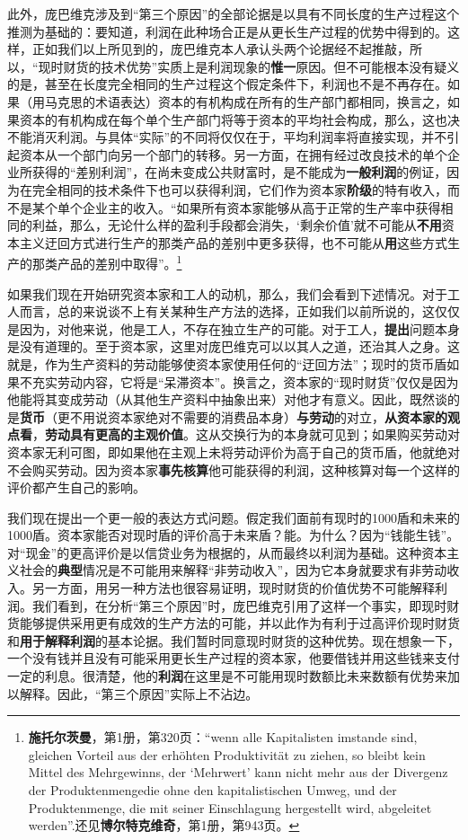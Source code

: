 \documentclass[fontset=fandol, a4paper, 12pt, openright]{ctexbook}
\begin{document}
此外，庞巴维克涉及到“第三个原因”的全部论据是以具有不同长度的生产过程这个推测为基础的：要知道，利润在此种场合正是从更长生产过程的优势中得到的。这样，正如我们以上所见到的，庞巴维克本人承认头两个论据经不起推敲，所以，“现时财货的技术优势”实质上是利润现象的\textbf{惟一}原因。但不可能根本没有疑义的是，甚至在长度完全相同的生产过程这个假定条件下，利润也不是不再存在。如果（用马克思的术语表达）资本的有机构成在所有的生产部门都相同，换言之，如果资本的有机构成在每个单个生产部门将等于资本的平均社会构成，那么，这也决不能消灭利润。与具体“实际”的不同将仅仅在于，平均利润率将直接实现，并不引起资本从一个部门向另一个部门的转移。另一方面，在拥有经过改良技术的单个企业所获得的“差别利润”，在尚未变成公共财富时，是不能成为\textbf{一般利润}的例证，因为在完全相同的技术条件下也可以获得利润，它们作为资本家\textbf{阶级}的特有收入，而不是某个单个企业主的收入。“如果所有资本家能够从高于正常的生产率中获得相同的利益，那么，无论什么样的盈利手段都会消失，‘剩余价值’就不可能从\textbf{不用}资本主义迂回方式进行生产的那类产品的差别中更多获得，也不可能从\textbf{用}这些方式生产的那类产品的差别中取得”。\footnote{\textbf{施托尔茨曼}，第1册，第320页：“wenn alle Kapitalisten imstande sind, gleichen Vorteil aus der erh\"{o}hten Produktivit\"{a}t zu ziehen, so bleibt kein Mittel des Mehrgewinns, der ‘Mehrwert’ kann nicht mehr aus der Divergenz der Produktenmengedie ohne den kapitalistischen Umweg, und der Produktenmenge, die mit seiner Einschlagung hergestellt wird, abgeleitet werden”.还见\textbf{博尔特克维奇}，第1册，第943页。}

如果我们现在开始研究资本家和工人的动机，那么，我们会看到下述情况。对于工人而言，总的来说谈不上有关某种生产方法的选择，正如我们以前所说的，这仅仅是因为，对他来说，他是工人，不存在独立生产的可能。对于工人，\textbf{提出}问题本身是没有道理的。至于资本家，这里对庞巴维克可以以其人之道，还治其人之身。这就是，作为生产资料的劳动能够使资本家使用任何的“迂回方法”；现时的货币盾如果不充实劳动内容，它将是“呆滞资本”。换言之，资本家的“现时财货”仅仅是因为他能将其变成劳动（从其他生产资料中抽象出来）对他才有意义。因此，既然谈的是\textbf{货币}（更不用说资本家绝对不需要的消费品本身）\textbf{与劳动}的对立，\textbf{从资本家的观点看}，\textbf{劳动具有更高的主观价值}。这从交换行为的本身就可见到；如果购买劳动对资本家无利可图，即如果他在主观上未将劳动评价为高于自己的货币盾，他就绝对不会购买劳动。因为资本家\textbf{事先核算}他可能获得的利润，这种核算对每一个这样的评价都产生自己的影响。

我们现在提出一个更一般的表达方式问题。假定我们面前有现时的1000盾和未来的1000盾。资本家能否对现时盾的评价高于未来盾？能。为什么？因为“钱能生钱”。对“现金”的更高评价是以信贷业务为根据的，从而最终以利润为基础。这种资本主义社会的\textbf{典型}情况是不可能用来解释“非劳动收入”，因为它本身就要求有非劳动收入。另一方面，用另一种方法也很容易证明，现时财货的价值优势不可能解释利润。我们看到，在分析“第三个原因”时，庞巴维克引用了这样一个事实，即现时财货能够提供采用更有成效的生产方法的可能，并以此作为有利于过高评价现时财货和\textbf{用于解释利润}的基本论据。我们暂时同意现时财货的这种优势。现在想象一下，一个没有钱并且没有可能采用更长生产过程的资本家，他要借钱并用这些钱来支付一定的利息。很清楚，他的\textbf{利润}在这里是不可能用现时数额比未来数额有优势来加以解释。因此，“第三个原因”实际上不沾边。
\end{document}
